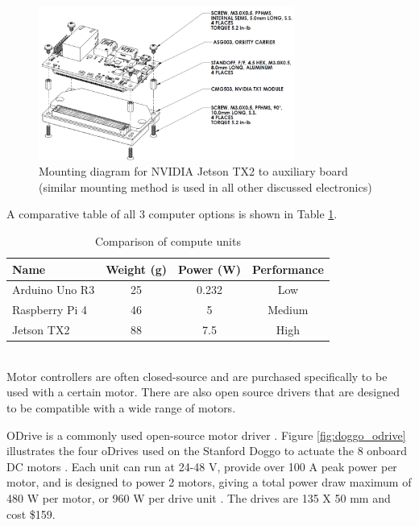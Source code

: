\begin{figure}[H]
    \centering
    \includegraphics[width=0.75\textwidth]{Sections/LiteratureReview/img/electronics/std_jetson.png}
    \caption{Mounting diagram for NVIDIA Jetson TX2 to auxiliary board (similar mounting method is used in all other discussed electronics) \cite{dietrich_orbitty_2019}}
    \label{fig:nvidia_jetson}
\end{figure}

A comparative table of all 3 computer options is shown in Table \ref{table:computers}.

\begin{table}
    \centering
    \caption{Comparison of compute units}
    \begin{tabular}{| l | c | c | c |} \hline
        Name & Weight (g) & Power (W) & Performance
        \\ \hline
        Arduino Uno R3 & 25 & 0.232 & Low
        \\ \hline
        Raspberry Pi 4 & 46 & 5 & Medium
        \\ \hline
        Jetson TX2 & 88 & 7.5 & High
        \\
        \hline
    \end{tabular}
    \label{table:computers}
\end{table}

\mbox{}\\

Motor controllers are often closed-source and are purchased specifically to be used with a certain motor.
There are also open source drivers that are designed to be compatible with a wide range of motors.

ODrive is a commonly used open-source motor driver \cite{weigl_odrive_nodate}.
Figure \ref{fig:doggo_odrive} illustrates the four oDrives used on the Stanford Doggo to actuate the 8 onboard DC motors \cite{kau_nate711/stanforddoggoproject_2019}.
Each unit can run at 24-48 V, provide over 100 A peak power per motor, and is designed to power 2 motors, giving a total power draw maximum of 480 W per motor, or 960 W per drive unit \cite{weigl_odrive_nodate}.
The drives are 135 X 50 mm and cost \$159.

